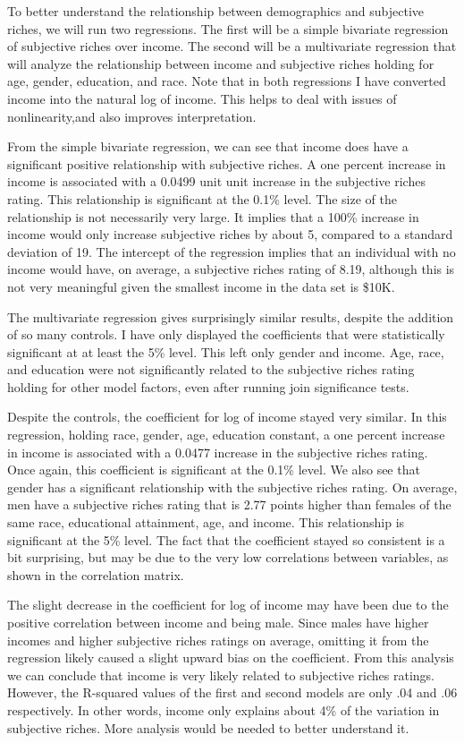 \documentclass[
]{article}
\begin{document}
To better understand the relationship between demographics and
subjective riches, we will run two regressions. The first will be a
simple bivariate regression of subjective riches over income. The second
will be a multivariate regression that will analyze the relationship
between income and subjective riches holding for age, gender, education,
and race. Note that in both regressions I have converted income into the
natural log of income. This helps to deal with issues of
nonlinearity,and also improves interpretation.

From the simple bivariate regression, we can see that income does have a
significant positive relationship with subjective riches. A one percent
increase in income is associated with a 0.0499 unit unit increase in the
subjective riches rating. This relationship is significant at the 0.1\%
level. The size of the relationship is not necessarily very large. It
implies that a 100\% increase in income would only increase subjective
riches by about 5, compared to a standard deviation of 19. The intercept
of the regression implies that an individual with no income would have,
on average, a subjective riches rating of 8.19, although this is not
very meaningful given the smallest income in the data set is \$10K.

The multivariate regression gives surprisingly similar results, despite
the addition of so many controls. I have only displayed the coefficients
that were statistically significant at at least the 5\% level. This left
only gender and income. Age, race, and education were not significantly
related to the subjective riches rating holding for other model factors,
even after running join significance tests.

Despite the controls, the coefficient for log of income stayed very
similar. In this regression, holding race, gender, age, education
constant, a one percent increase in income is associated with a 0.0477
increase in the subjective riches rating. Once again, this coefficient
is significant at the 0.1\% level. We also see that gender has a
significant relationship with the subjective riches rating. On average,
men have a subjective riches rating that is 2.77 points higher than
females of the same race, educational attainment, age, and income. This
relationship is significant at the 5\% level. The fact that the
coefficient stayed so consistent is a bit surprising, but may be due to
the very low correlations between variables, as shown in the correlation
matrix.

The slight decrease in the coefficient for log of income may have been
due to the positive correlation between income and being male. Since
males have higher incomes and higher subjective riches ratings on
average, omitting it from the regression likely caused a slight upward
bias on the coefficient. From this analysis we can conclude that income
is very likely related to subjective riches ratings. However, the
R-squared values of the first and second models are only .04 and .06
respectively. In other words, income only explains about 4\% of the
variation in subjective riches. More analysis would be needed to better
understand it.
\end{document}
